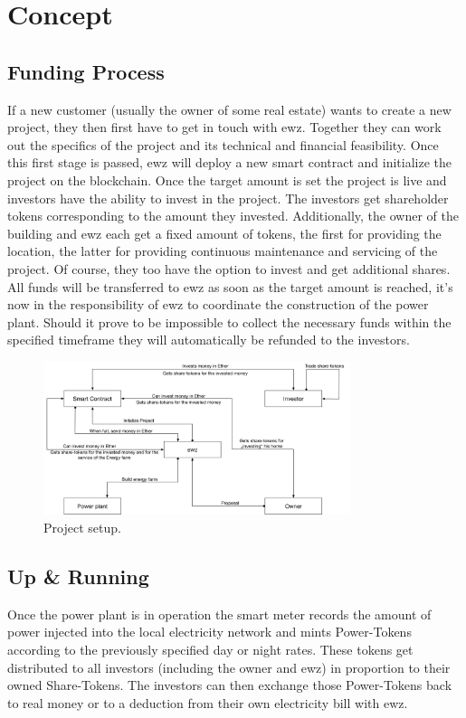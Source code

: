 \section{Concept}
\subsection{Funding Process}
If a new customer (usually the owner of some real estate) wants to create a new project, they then first have to get in touch with ewz. Together they can work out the specifics of the project and its technical and financial feasibility. Once this first stage is passed, ewz will deploy a new smart contract and initialize the project on the blockchain. Once the target amount is set the project is live and investors have the ability to invest in the project. The investors get shareholder tokens corresponding to the amount they invested. Additionally, the owner of the building and ewz each get a fixed amount of tokens, the first for providing the location, the latter for providing continuous maintenance and servicing of the project. Of course, they too have the option to invest and get additional shares. All funds will be transferred to ewz as soon as the target amount is reached, it's now in the responsibility of ewz to coordinate the construction of the power plant. Should it prove to be impossible to collect the necessary funds within the specified timeframe they will automatically be refunded to the investors.

\begin{figure}[h]
\centering
\includegraphics[width=0.8\textwidth]{images/IMG_0232.JPG}
\caption{\label{fig:blockchain}Project setup.}
\end{figure}

\subsection{Up \& Running}
Once the power plant is in operation the smart meter records the amount of power injected into the local electricity network and mints Power-Tokens according to the previously specified day or night rates.
These tokens get distributed to all investors (including the owner and ewz) in proportion to their owned Share-Tokens. The investors can then exchange those Power-Tokens back to real money or to a deduction from their own electricity bill with ewz.


